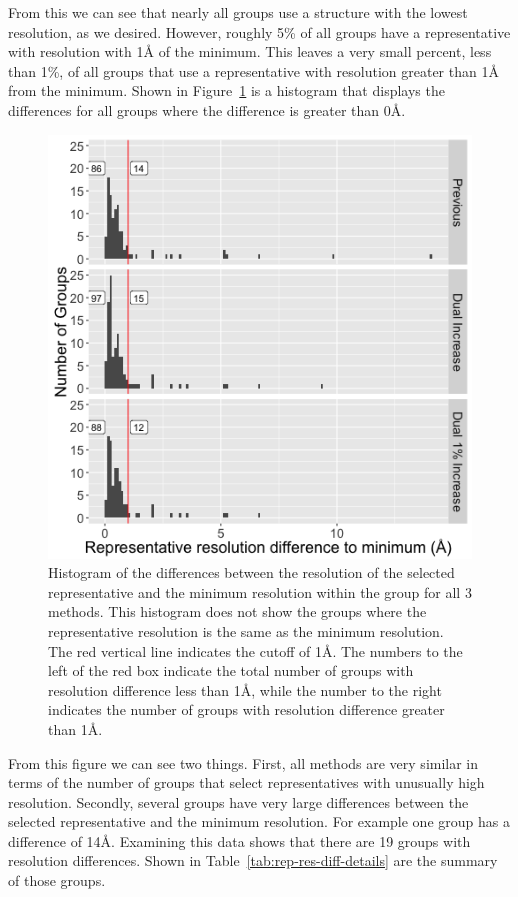 From this we can see that nearly all groups use a structure with the lowest
resolution, as we desired. However, roughly 5\% of all groups have a
representative with resolution with 1{\AA} of the minimum. This leaves a very small
percent, less than 1\%, of all groups that use a representative with resolution
greater than 1{\AA} from the minimum. Shown in Figure~\ref{fig:res-diff-histogram}
is a histogram that displays the differences for all groups where the difference
is greater than 0{\AA}.

\begin{figure}
  \includegraphics[width=0.5\linewidth]{chapter-4/figs/res-diff}
  \caption{Histogram of the differences between the resolution of the selected
    representative and the minimum resolution within the group for all 3
    methods. This histogram does not show the groups where the representative
    resolution is the same as the minimum resolution.  The red vertical line
    indicates the cutoff of 1{\AA}. The numbers to the left of the red box indicate
    the total number of groups with resolution difference less than 1{\AA}, while
    the number to the right indicates the number of groups with resolution
  difference greater than 1{\AA}.}
  \label{fig:res-diff-histogram}
\end{figure}

From this figure we can see two things. First, all methods are very similar in
terms of the number of groups that select representatives with unusually high
resolution. Secondly, several groups have very large differences between the
selected representative and the minimum resolution. For example one group has a
difference of 14\AA. Examining this data shows that there are 19 groups with
resolution differences. Shown in Table~\ref{tab:rep-res-diff-details} are the
summary of those groups.

